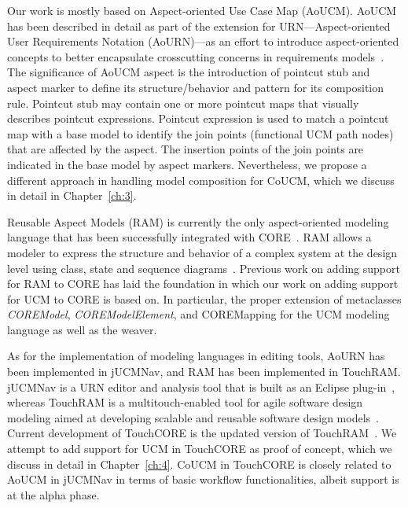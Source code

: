 Our work is mostly based on Aspect-oriented Use Case Map (AoUCM). AoUCM has been described in detail as part of the extension for URN---Aspect-oriented User Requirements Notation (AoURN)---as an effort to introduce aspect-oriented concepts to better encapsulate crosscutting concerns in requirements models~\cite{mussbacher2011aspect}. The significance of AoUCM aspect is the introduction of pointcut stub and aspect marker to define its structure/behavior and pattern for its composition rule. Pointcut stub may contain one or more pointcut maps that visually describes pointcut expressions. Pointcut expression is used to match a pointcut map with a base model to identify the join points (functional UCM path nodes) that are affected by the aspect. The insertion points of the join points are indicated in the base model by aspect markers. Nevertheless, we propose a different approach in handling model composition for CoUCM, which we discuss in detail in Chapter~\ref{ch:3}.

Reusable Aspect Models (RAM) is currently the only aspect-oriented modeling language that has been successfully integrated with CORE~\cite{klein2007reusable}. RAM allows a modeler to express the structure and behavior of a complex system at the design level using class, state and sequence diagrams~\cite{kienzle2010aspect}. Previous work on adding support for RAM to CORE has laid the foundation in which our work on adding support for UCM to CORE is based on. In particular, the proper extension of metaclasses \textit{\cls COREModel}, \textit{\cls COREModelElement}, and {\cls COREMapping} for the UCM modeling language as well as the weaver.

As for the implementation of modeling languages in editing tools, AoURN has been implemented in jUCMNav, and RAM has been implemented in TouchRAM. jUCMNav is a URN editor and analysis tool that is built as an Eclipse plug-in~\cite{kealey2007enhanced}, whereas TouchRAM is a multitouch-enabled tool for agile software design modeling aimed at developing scalable and reusable software design models~\cite{al2012touchram, schottle2014touchram}. Current development of TouchCORE is the updated version of TouchRAM~\cite{sel2018touchcore}. We attempt to add support for UCM in TouchCORE as proof of concept, which we discuss in detail in Chapter~\ref{ch:4}. CoUCM in TouchCORE is closely related to AoUCM in jUCMNav in terms of basic workflow functionalities, albeit support is at the alpha phase.

